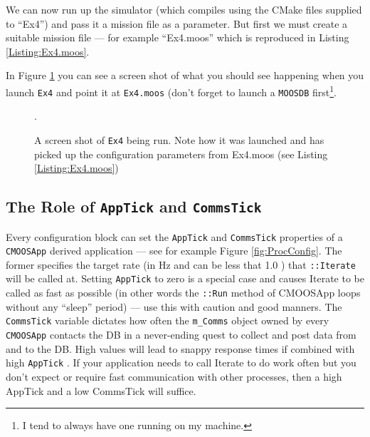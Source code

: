 \documentclass[a4paper,10pt]{article}
\newcommand{\Code}[1]{\texttt{#1} }
\newcommand{\code}[1]{\Code{#1} }
\begin{document}


We can now run up the simulator (which compiles using the CMake files supplied to ``Ex4'') and pass it a mission file as a parameter. But first we must create a suitable mission file --- for example ``Ex4.moos'' which is reproduced in Listing \ref{Listing:Ex4.moos}.



In Figure \ref{Fig:RunningEx4} you can see a screen shot of what you should see happening when you launch \code{Ex4} and point it at \code{Ex4.moos} (don't forget to launch a \code{MOOSDB} first\footnote{I tend to always have one running on my machine.}.

\begin{figure}
\begin{center}
\end{center}
\caption{A screen shot of \code{Ex4} being run. Note how it was launched and has picked up the configuration parameters from Ex4.moos (see Listing \ref{Listing:Ex4.moos})}\label{Fig:RunningEx4}.
\end{figure}


\subsection{The Role of \code{AppTick} and \code{CommsTick }}

Every configuration block can set the \code{AppTick} and \code{CommsTick} properties of a \code{CMOOSApp} derived application --- see for example Figure \ref{fig:ProcConfig}. The former specifies the target rate (in Hz and can be less that 1.0 ) that \code{::Iterate} will be called at. Setting \code{AppTick} to zero is a special case and causes Iterate to be called as fast as possible (in other words the \code{::Run} method of CMOOSApp loops without any ``sleep'' period) --- use this with caution and good manners. The \code{CommsTick} variable dictates how often the \code{m\_Comms} object owned by every \code{CMOOSApp} contacts the DB in a never-ending quest to collect and post data from and to the DB. High values will lead to snappy response times if combined with high \code{AppTick}. If your application needs to call Iterate to do work often but you don't expect or require fast communication with other processes, then a high AppTick and a low CommsTick will suffice.
\end{document}
